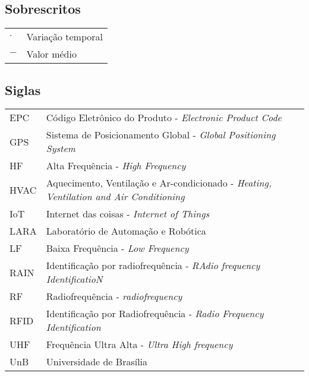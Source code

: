 \subsection*{Sobrescritos}

\begin{tabular}{p{}p{}}
$\cdot$  & Variação temporal \tabularnewline
$-$  & Valor médio \tabularnewline
\end{tabular}


\subsection*{Siglas}

\begin{tabular}{p{}p{}}
EPC  & Código Eletrônico do Produto - \textit{Electronic Product Code}\tabularnewline
GPS & Sistema de Posicionamento Global - \textit{Global Positioning System} \tabularnewline
HF & Alta Frequência - \textit{High Frequency} \tabularnewline
HVAC & Aquecimento, Ventilação e Ar-condicionado - \textit{Heating, Ventilation and Air Conditioning}\tabularnewline
IoT & Internet das coisas - \textit{Internet of Things} \tabularnewline
LARA & Laboratório de Automação e Robótica \tabularnewline
LF & Baixa Frequência - \textit{Low Frequency} \tabularnewline
RAIN & Identificação por radiofrequência - \textit{RAdio frequency IdentificatioN} \tabularnewline
RF & Radiofrequência - \textit{radiofrequency} \tabularnewline
RFID & Identificação por Radiofrequência - \textit{Radio Frequency Identification}\tabularnewline
UHF & Frequência Ultra Alta - \textit{Ultra High frequency} \tabularnewline
UnB & Universidade de Brasília \tabularnewline
\end{tabular}
